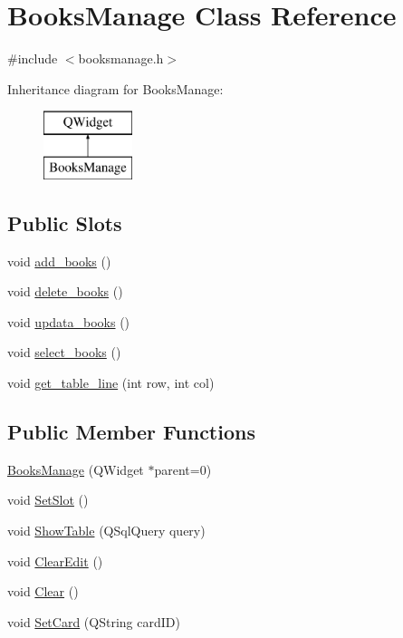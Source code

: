 \hypertarget{class_books_manage}{}\section{Books\+Manage Class Reference}
\label{class_books_manage}


{\ttfamily \#include $<$booksmanage.\+h$>$}

Inheritance diagram for Books\+Manage\+:\begin{figure}[H]
\begin{center}
\leavevmode
\includegraphics[height=2.000000cm]{class_books_manage}
\end{center}
\end{figure}
\subsection*{Public Slots}
\begin{DoxyCompactItemize}
\item 
void \mbox{\hyperlink{class_books_manage_a39c7bdd07e0af93379e1270becd8525c}{add\+\_\+books}} ()
\item 
void \mbox{\hyperlink{class_books_manage_ae8adc7f70a2e95f5a5991137e11a18ae}{delete\+\_\+books}} ()
\item 
void \mbox{\hyperlink{class_books_manage_aba42cfe2129f1b92dab5a08e1f73ee07}{updata\+\_\+books}} ()
\item 
void \mbox{\hyperlink{class_books_manage_ab2a76473efc3b68a9e1589cca6ab615d}{select\+\_\+books}} ()
\item 
void \mbox{\hyperlink{class_books_manage_a0269967278f32edfd3f14ccff0a41715}{get\+\_\+table\+\_\+line}} (int row, int col)
\end{DoxyCompactItemize}
\subsection*{Public Member Functions}
\begin{DoxyCompactItemize}
\item 
\mbox{\hyperlink{class_books_manage_adc44f2312ab4d2cd48868ff923fa8861}{Books\+Manage}} (Q\+Widget $\ast$parent=0)
\item 
void \mbox{\hyperlink{class_books_manage_a0ee0a3e432c7789497c17758d1f82fdf}{Set\+Slot}} ()
\item 
void \mbox{\hyperlink{class_books_manage_abbacf5e112bdee769aaa4d22c0e14744}{Show\+Table}} (Q\+Sql\+Query query)
\item 
void \mbox{\hyperlink{class_books_manage_aa5b813a7fb68aa61a143f84c87699c83}{Clear\+Edit}} ()
\item 
void \mbox{\hyperlink{class_books_manage_a8388b6b8547cc759a9976c1a567aab0a}{Clear}} ()
\item 
void \mbox{\hyperlink{class_books_manage_a009c231a6f8976be927b7acfdc4d4591}{Set\+Card}} (Q\+String card\+ID)
\end{DoxyCompactItemize}


